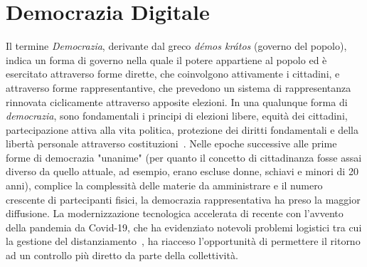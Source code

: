 \documentclass[12pt,a4paper,openright,twoside]{book}
\begin{document}
\chapter{Democrazia Digitale}
Il termine \textit{Democrazia}, derivante dal greco \textit{démos krátos} (governo del popolo),
indica un forma di governo nella quale il potere appartiene al popolo ed è esercitato attraverso forme dirette, che coinvolgono attivamente
i cittadini, e attraverso forme rappresentantive, che prevedono un sistema di rappresentanza rinnovata ciclicamente
attraverso apposite elezioni.
In una qualunque forma di \textit{democrazia}, sono fondamentali i principi di elezioni libere, equità dei cittadini, partecipazione
attiva alla vita politica, protezione dei diritti fondamentali e della libertà personale attraverso costituzioni~\cite{vinod2017state}.
Nelle epoche successive alle prime forme di democrazia "unanime" (per quanto il concetto di cittadinanza fosse assai diverso da quello attuale,
ad esempio, erano escluse donne, schiavi e minori di 20 anni), complice la complessità
delle materie da amministrare e il numero crescente di partecipanti fisici, la democrazia
rappresentativa ha preso la maggior diffusione. 
La modernizzazione tecnologica accelerata di recente con l'avvento della pandemia da Covid-19, che ha evidenziato notevoli problemi
logistici tra cui la gestione del distanziamento~\cite{sotoacosta}, ha riacceso l'opportunità di
permettere il ritorno ad un controllo più diretto da parte della collettività.
\end{document}
